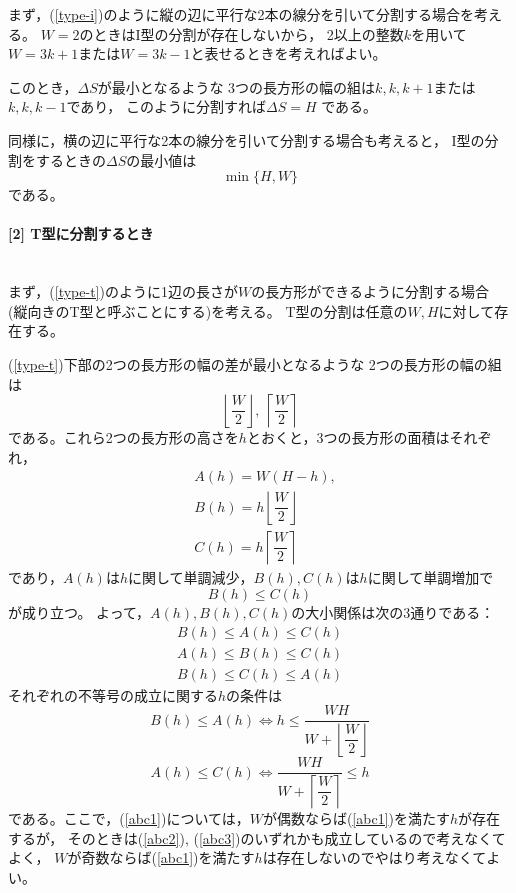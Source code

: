 \documentclass{article}
\newcommand{\myparagraph}[1]{\paragraph{#1}\mbox{}\\}
\begin{document}
まず，(\cref{type-i})のように縦の辺に平行な2本の線分を引いて分割する場合を考える。
$W = 2$のときはI型の分割が存在しないから，
2以上の整数$k$を用いて$W = 3k + 1$または$W = 3k - 1$と表せるときを考えればよい。

このとき，$\Delta S$が最小となるような
3つの長方形の幅の組は$k, k, k + 1$または$k, k, k - 1$であり，
このように分割すれば$\Delta S = H$ である。

同様に，横の辺に平行な2本の線分を引いて分割する場合も考えると，
I型の分割をするときの$\Delta S$の最小値は
\begin{equation}
    \label{min-i}
    \min \{H, W\}
\end{equation}
である。

\myparagraph{[2] T型に分割するとき}

まず，(\cref{type-t})のように1辺の長さが$W$の長方形ができるように分割する場合
(縦向きのT型と呼ぶことにする)を考える。
T型の分割は任意の$W, H$に対して存在する。

(\cref{type-t})下部の2つの長方形の幅の差が最小となるような
2つの長方形の幅の組は
\begin{equation}
    \label{w2}
    \left\lfloor \dfrac{W}{2} \right\rfloor,\ \left\lceil \dfrac{W}{2} \right\rceil
\end{equation}
である。これら2つの長方形の高さを$h$とおくと，3つの長方形の面積はそれぞれ，
\begin{eqnarray*}
    &A(h) = W (H - h), \\
    &B(h) = h \left\lfloor \dfrac{W}{2} \right\rfloor \\
    &C(h) = h \left\lceil  \dfrac{W}{2} \right\rceil
\end{eqnarray*}
であり，$A(h)$は$h$に関して単調減少，$B(h), C(h)$は$h$に関して単調増加で
\begin{equation}
    \label{b_c}
    B(h) \leq C(h)
\end{equation}
が成り立つ。
よって，$A(h), B(h), C(h)$の大小関係は次の3通りである：
\begin{eqnarray}
    \label{abc1}
    B(h) \leq A(h) \leq C(h) \\
    \label{abc2}
    A(h) \leq B(h) \leq C(h) \\
    \label{abc3}
    B(h) \leq C(h) \leq A(h)
\end{eqnarray}
それぞれの不等号の成立に関する$h$の条件は
\begin{equation*}
    B(h) \leq A(h)
    \Longleftrightarrow
    h \leq
    \dfrac{WH}{ W + \left\lfloor \dfrac{W}{2} \right\rfloor }
\end{equation*}
\begin{equation*}
    A(h) \leq C(h)
    \Longleftrightarrow
    \dfrac{WH}{ W + \left\lceil \dfrac{W}{2} \right\rceil }
    \leq h
\end{equation*}
である。ここで，(\ref{abc1})については，$W$が偶数ならば(\ref{abc1})を満たす$h$が存在するが，
そのときは(\ref{abc2}), (\ref{abc3})のいずれかも成立しているので考えなくてよく，
$W$が奇数ならば(\ref{abc1})を満たす$h$は存在しないのでやはり考えなくてよい。
\end{document}
